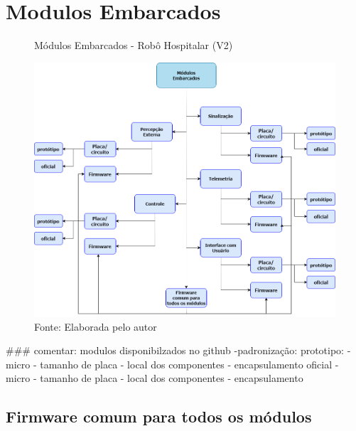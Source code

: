 \documentclass[../delivery_hospital_report.tex]{subfiles}
\begin{document}
\chapter{Modulos Embarcados}

\begin{figure}[h]
\centering
    \caption{Módulos Embarcados - Robô Hospitalar (V2)}
    \centering %
    \includegraphics[width=16cm]{modulos_embarcados.png}
    \caption*{Fonte: Elaborada pelo autor}
    \label{figura:1° Versão Robô Hospitalar}
\end{figure}


###
comentar:
modulos disponibilzados no github
-padronização:
    prototipo:
        - micro
        - tamanho de placa
        - local dos componentes
        - encapsulamento
    oficial
        - micro
         - tamanho de placa
        - local dos componentes
        - encapsulamento

\section{Firmware comum para todos os módulos}















\end{document}
